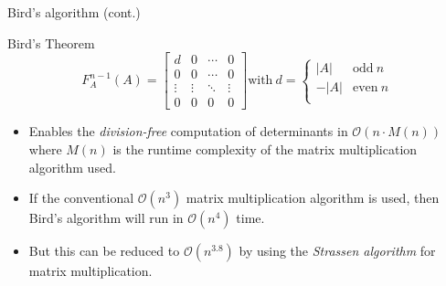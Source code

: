\documentclass{beamer}
\begin{document}
\begin{frame}{Bird's algorithm (cont.)}

    \begin{block}{Bird's Theorem}
        \[
            F_A^{n-1}(A) =
            \begin{bmatrix}{}
                d      & 0      & \cdots & 0 \\
                0      & 0      & \cdots & 0 \\
                \vdots & \vdots & \ddots & \vdots \\
                0      & 0      & 0      & 0
            \end{bmatrix}
            \text{with} \ d =
            \begin{cases}{}
                |A|  & \text{odd} \ n \\
                -|A| & \text{even} \ n \\
            \end{cases}
        \]
    \end{block}

    \begin{itemize}

        \item Enables the \emph{division-free} computation of determinants in
            $\mathcal{O}(n\cdot M(n))$ where $M(n)$ is the runtime complexity of the matrix
            multiplication algorithm used.

        \item If the conventional $\mathcal{O}(n^3)$ matrix multiplication algorithm is used,
            then Bird's algorithm will run in $\mathcal{O}(n^4)$ time.

        \item But this can be reduced to $\mathcal{O}(n^{3.8})$ by using the
            \emph{Strassen algorithm} for matrix multiplication.

    \end{itemize}

\end{frame}
\end{document}
